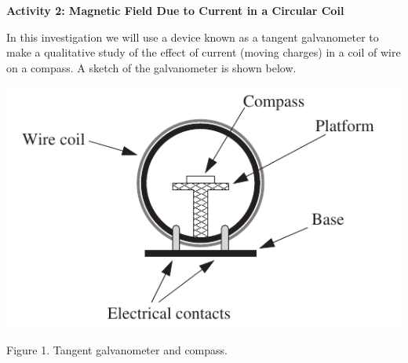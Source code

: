 \textbf{Activity 2: Magnetic Field Due to Current in a Circular Coil}

In this investigation we will use a device known as a tangent galvanometer to make a qualitative study of the effect of current (moving charges) in a coil of wire on a compass. A sketch of the galvanometer is shown below.

\begin{center}
\includegraphics{magnetism_currents/tangent_galvanometer_bw.pdf}
\par
Figure 1. Tangent galvanometer and compass.
\end{center}

